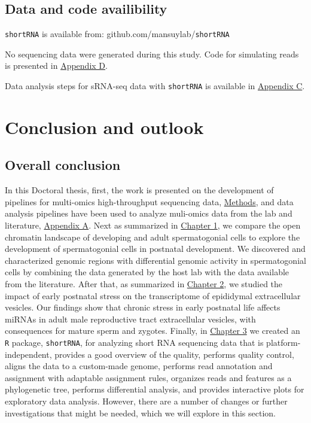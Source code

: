 \documentclass[12pt,twoside]{reedthesis}
\begin{document}
\hypertarget{data-and-code-availibility}{%
\section{Data and code availibility}\label{data-and-code-availibility}}

\texttt{shortRNA} is available from: github.com/mansuylab/\texttt{shortRNA}

No sequencing data were generated during this study. Code for simulating
reads is presented in \protect\hyperlink{ad}{Appendix D}.

Data analysis steps for sRNA-seq data with \texttt{shortRNA} is available in
\protect\hyperlink{ac}{Appendix C}.

\hypertarget{conclusion}{%
\chapter*{Conclusion and outlook}\label{conclusion}}

\hypertarget{overall-conclusion}{%
\section*{Overall conclusion}\label{overall-conclusion}}

In this Doctoral thesis, first, the work is presented on the development of pipelines for multi-omics high-throughput sequencing data, \protect\hyperlink{methods}{Methods}, and data analysis pipelines have been used to analyze muli-omics data from the lab and literature, \protect\hyperlink{aa}{Appendix A}. Next as summarized in \protect\hyperlink{chapter1}{Chapter 1}, we compare the open chromatin landscape of developing and adult spermatogonial cells to explore the development of spermatogonial cells in postnatal development. We discovered and characterized genomic regions with differential genomic activity in spermatogonial cells by combining the data generated by the host lab with the data available from the literature. After that, as summarized in \protect\hyperlink{chapter2}{Chapter 2}, we studied the impact of early postnatal stress on the transcriptome of epididymal extracellular vesicles. Our findings show that chronic stress in early postnatal life affects miRNAs in adult male reproductive tract extracellular vesicles, with consequences for mature sperm and zygotes. Finally, in \protect\hyperlink{chapter3}{Chapter 3} we created an \texttt{R} package, \texttt{shortRNA}, for analyzing short RNA sequencing data that is platform-independent, provides a good overview of the quality, performs quality control, aligns the data to a custom-made genome, performs read annotation and assignment with adaptable assignment rules, organizes reads and features as a phylogenetic tree, performs differential analysis, and provides interactive plots for exploratory data analysis. However, there are a number of changes or further investigations that might be needed, which we will explore in this section.
\end{document}
